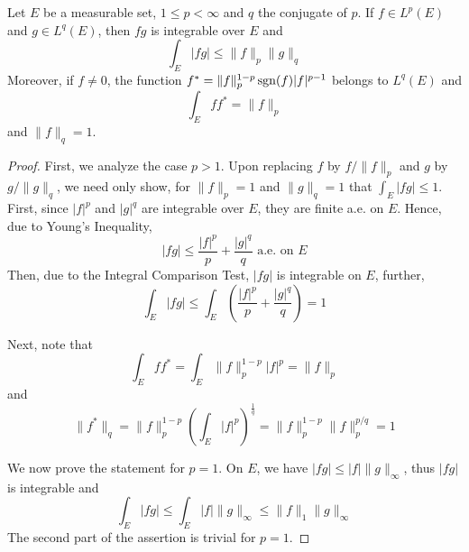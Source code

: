 \begin{theorem}[H\"older]
    Let $E$ be a measurable set, $1\le p < \infty$ and $q$ the conjugate of $p$. If $f\in L^p(E)$ and $g\in L^q(E)$, then $fg$ is integrable over $E$ and 
    \begin{equation*}
        \int_E|fg|\le\|f\|_p\|g\|_q
    \end{equation*}
    Moreover, if $f\ne 0$, the function $f^* = \|f\|_p^{1 - p}\operatorname{sgn}(f)|f|^{p - 1}$ belongs to $L^q(E)$ and 
    \begin{equation*}
        \int_E ff^* = \|f\|_p 
    \end{equation*}
    and $\|f\|_q = 1$.
\end{theorem}
\begin{proof}
    First, we analyze the case $p > 1$. Upon replacing $f$ by $f/\|f\|_p$ and $g$ by $g/\|g\|_q$, we need only show, for $\|f\|_p = 1$ and $\|g\|_q = 1$ that $\int_E|fg|\le 1$. First, since $|f|^p$ and $|g|^q$ are integrable over $E$, they are finite a.e. on $E$. Hence, due to Young's Inequality, 
    \begin{equation*}
        |fg|\le\frac{|f|^p}{p} + \frac{|g|^q}{q}\text{ a.e. on }E
    \end{equation*}
    Then, due to the Integral Comparison Test, $|fg|$ is integrable on $E$, further, 
    \begin{equation*}
        \int_E|fg|\le\int_E\left(\frac{|f|^p}{p} + \frac{|g|^q}{q}\right) = 1
    \end{equation*}
    
    Next, note that 
    \begin{equation*}
        \int_E ff^* = \int_E\|f\|_p^{1 - p}|f|^p = \|f\|_p
    \end{equation*}
    and 
    \begin{equation*}
        \|f^*\|_q = \|f\|^{1 - p}_p\left(\int_E|f|^{p}\right)^{\frac{1}{q}} = \|f\|_p^{1 - p}\|f\|_p^{p/q} = 1
    \end{equation*}

    We now prove the statement for $p = 1$. On $E$, we have $|fg|\le|f|\|g\|_\infty$, thus $|fg|$ is integrable and 
    \begin{equation*}
        \int_E|fg|\le\int_E|f|\|g\|_\infty\le\|f\|_1\|g\|_\infty
    \end{equation*}
    The second part of the assertion is trivial for $p = 1$.
\end{proof}

